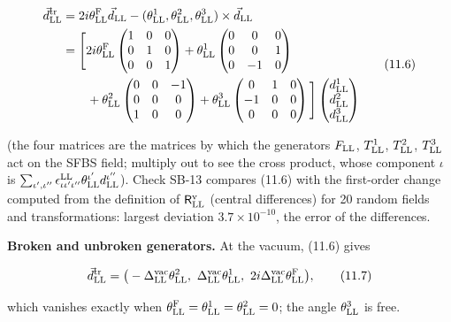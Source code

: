 \documentclass[
  10pt,
]{article}
\begin{document}
\[\begin{aligned}\vec d^{\rm tr}_{\rm LL}&=2i\theta^{\rm F}_{\rm LL}\vec d_{\rm LL}-(\theta^1_{\rm LL},\theta^2_{\rm LL},\theta^3_{\rm LL})\times\vec d_{\rm LL}\\&=\Bigg[2i\theta^{\rm F}_{\rm LL}\begin{pmatrix}1&0&0\\0&1&0\\0&0&1\end{pmatrix}+\theta^1_{\rm LL}\begin{pmatrix}0&0&0\\0&0&1\\0&-1&0\end{pmatrix}\\&\qquad+\theta^2_{\rm LL}\begin{pmatrix}0&0&-1\\0&0&0\\1&0&0\end{pmatrix}+\theta^3_{\rm LL}\begin{pmatrix}0&1&0\\-1&0&0\\0&0&0\end{pmatrix}\Bigg]\begin{pmatrix}d^1_{\rm LL}\\d^2_{\rm LL}\\d^3_{\rm LL}\end{pmatrix}\end{aligned}\tag{11.6}\]

(the four matrices are the matrices by which the generators
\(F_{\rm LL}\), \(T^1_{\rm LL}\), \(T^2_{\rm LL}\), \(T^3_{\rm LL}\) act
on the SFBS field; multiply out to see the cross product, whose
component \(\iota\) is
\(\sum_{\iota',\iota''}\epsilon^{\rm LL}_{\iota\iota'\iota''}\theta^{\iota'}_{\rm LL}d^{\iota''}_{\rm LL}\)).
Check SB-13 compares (11.6) with the first-order change computed from
the definition of \(\mathsf R^{\rm v}_{\rm LL}\) (central differences)
for 20 random fields and transformations: largest deviation
\(3.7\times10^{-10}\), the error of the differences.

\textbf{Broken and unbroken generators.} At the vacuum, (11.6) gives

\[\vec d^{\rm tr}_{\rm LL}=\big(-\Delta^{\rm vac}_{\rm LL}\theta^2_{\rm LL},\ \Delta^{\rm vac}_{\rm LL}\theta^1_{\rm LL},\ 2i\Delta^{\rm vac}_{\rm LL}\theta^{\rm F}_{\rm LL}\big),\tag{11.7}\]

which vanishes exactly when
\(\theta^{\rm F}_{\rm LL}=\theta^1_{\rm LL}=\theta^2_{\rm LL}=0\); the
angle \(\theta^3_{\rm LL}\) is free.
\end{document}
